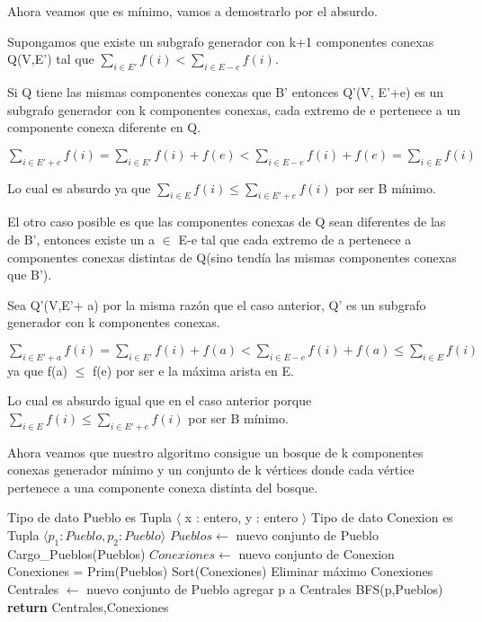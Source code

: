 Ahora veamos que es mínimo, vamos a demostrarlo por el absurdo.

Supongamos que existe un subgrafo generador con k+1 componentes conexas Q(V,E') tal que $\sum_{i \in E'} f(i) < \sum_{i \in E-e} f(i)$.

Si Q tiene las mismas componentes conexas que B' entonces Q'(V, E'+e) es un subgrafo generador con k componentes conexas, cada extremo de e pertenece a un componente conexa diferente en Q.

$\sum_{i \in E'+e} f(i) = \sum_{i \in E'} f(i) + f(e) < \sum_{i \in E-e} f(i) + f(e) = \sum_{i \in E} f(i)$

Lo cual es absurdo ya que $\sum_{i \in E} f(i) \leq \sum_{i \in E'+e} f(i)$ por ser B mínimo.

El otro caso posible es que las componentes conexas de Q sean diferentes de las de B', entonces existe un a $\in$ E-e tal que cada extremo de a pertenece a componentes conexas distintas de Q(sino tendía las mismas componentes conexas que B').

Sea Q'(V,E'+ a) por la misma razón que el caso anterior, Q' es un subgrafo generador con k componentes conexas.

$\sum_{i \in E'+a} f(i) = \sum_{i \in E'} f(i) + f(a) < \sum_{i \in E-e} f(i) + f(a) \leq \sum_{i \in E} f(i)$ ya que f(a) $\leq$ f(e) por ser e la máxima arista en E.

Lo cual es absurdo igual que en el caso anterior porque $\sum_{i \in E} f(i) \leq \sum_{i \in E'+e} f(i)$ por ser B mínimo.

Ahora veamos que nuestro algoritmo consigue un bosque de k componentes conexas generador mínimo y un conjunto de k vértices donde cada vértice pertenece a una componente conexa distinta del bosque.

\begin{center}
\begin{pseudo}
\State Tipo de dato Pueblo es Tupla $\langle$ x : entero, y : entero $\rangle$
\State Tipo de dato Conexion es Tupla $\langle p_1 : Pueblo, p_2 : Pueblo \rangle$
        \State $Pueblos \leftarrow$ nuevo conjunto de Pueblo 
        \State Cargo\_Pueblos(Pueblos) 
        \State $Conexiones \leftarrow$ nuevo conjunto de Conexion 
        \State Conexiones = Prim(Pueblos) 
        \State Sort(Conexiones) 
         
	  \State Eliminar máximo Conexiones 
	\EndFor
        \State Centrales $\leftarrow$ nuevo conjunto de Pueblo 
        \State agregar p a Centrales
        \State BFS(p,Pueblos)
        \EndWhile
        \State \textbf{return} Centrales,Conexiones 
    \EndProcedure
\end{pseudo}
\end{center}

